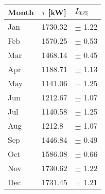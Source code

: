 \begin{tabular}{lll}
\toprule
Month & $\tau$ [kW] &  $I_{95\%}$ \\
\midrule
  Jan &     1730.32 &  $\pm$ 1.22 \\
  Feb &     1570.25 &  $\pm$ 0.53 \\
  Mar &     1468.14 &  $\pm$ 0.45 \\
  Apr &     1188.71 &  $\pm$ 1.13 \\
  May &     1141.06 &  $\pm$ 1.25 \\
  Jun &     1212.67 &  $\pm$ 1.07 \\
  Jul &     1140.58 &  $\pm$ 1.25 \\
  Aug &      1212.8 &  $\pm$ 1.07 \\
  Sep &     1446.84 &  $\pm$ 0.49 \\
  Oct &     1586.08 &  $\pm$ 0.66 \\
  Nov &     1730.62 &  $\pm$ 1.22 \\
  Dec &     1731.45 &  $\pm$ 1.21 \\
\bottomrule
\end{tabular}
